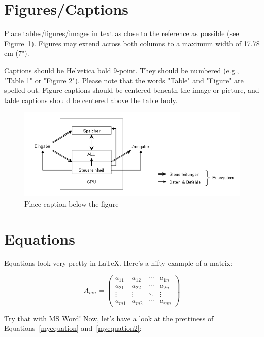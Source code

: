 	\balance
	
	\section{Figures/Captions}
	Place tables/figures/images in text as close to the reference as possible
	(see Figure~\ref{myfigure}). Figures may extend across both columns to a
	maximum width of 17.78 cm (7").
	\par
	Captions should be Helvetica bold 9-point. They should be numbered (e.g.,
	"Table 1" or "Figure 2"). Please note that the words "Table" and "Figure"
	are spelled out. Figure captions should be centered beneath the image or
	picture, and table captions should be centered above the table body.
	
	\begin{figure}[htbp]
		\includegraphics[width=\columnwidth]{images/beispiel.png}
		\caption{Place caption below the figure}
		\label{myfigure}
	\end{figure}
	
	\section{Equations}
	Equations look very pretty in \LaTeX. Here's a nifty example of a matrix:
	
	\begin{equation}
	 A_{mn} =
	 \begin{pmatrix}
	  a_{11} & a_{12} & \cdots & a_{1n} \\
	  a_{21} & a_{22} & \cdots & a_{2n} \\
	  \vdots  & \vdots  & \ddots & \vdots  \\
	  a_{m1} & a_{m2} & \cdots & a_{mn}
	 \end{pmatrix}
	\end{equation}
	
	Try that with MS Word! Now, let's have a look at the prettiness 
	of Equations~\ref{myequation} and~\ref{myequation2}:
	
